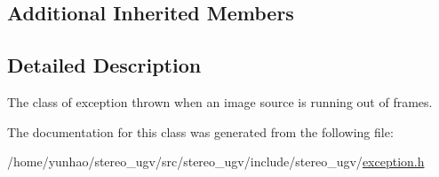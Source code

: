 \subsection*{Additional Inherited Members}


\subsection{Detailed Description}
The class of exception thrown when an image source is running out of frames. 

The documentation for this class was generated from the following file\+:\begin{DoxyCompactItemize}
\item 
/home/yunhao/stereo\+\_\+ugv/src/stereo\+\_\+ugv/include/stereo\+\_\+ugv/\hyperlink{exception_8h}{exception.\+h}\end{DoxyCompactItemize}
